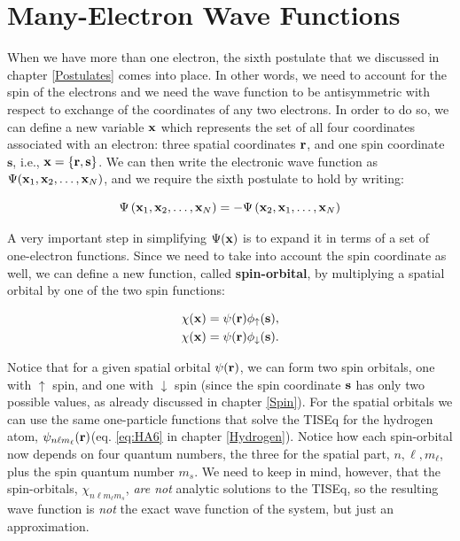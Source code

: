 \documentclass[
  9pt,
]{extbook}
\theoremstyle{definition}
\theoremstyle{definition}
\theoremstyle{definition}
\theoremstyle{remark}
\begin{document}
\hypertarget{many-electron-wave-functions}{%
\section{Many-Electron Wave Functions}\label{many-electron-wave-functions}}

When we have more than one electron, the sixth postulate that we discussed in chapter \ref{Postulates} comes into place. In other words, we need to account for the spin of the electrons and we need the wave function to be antisymmetric with respect to exchange of the coordinates of any two electrons. In order to do so, we can define a new variable \({\bf x}\) which represents the set of all four coordinates associated with an electron: three spatial coordinates \({\bf r}\), and one spin coordinate \(\mathbf{s}\), i.e., \({\bf x} = \{ {\bf r}, {\bf s} \}\). We can then write the electronic wave function as \(\Psi({\bf x}_1, {\bf x}_2, \ldots, {\bf x}_N)\), and we require the sixth postulate to hold by writing:

\begin{equation}
\Psi\left({\bf x}_1,{\bf x}_2,\ldots, {\bf x}_N\right) = - \Psi\left({\bf x}_2,{\bf x}_1,\ldots, {\bf x}_N\right)
\label{eq:atom2}  
\end{equation}

A very important step in simplifying \(\Psi({\bf x})\) is to expand it in terms of a set of one-electron functions. Since we need to take into account the spin coordinate as well, we can define a new function, called \textbf{spin-orbital}, by multiplying a spatial orbital by one of the two spin functions:

\begin{equation}
\begin{aligned}
\chi({\bf x}) &= \psi({\bf r}) \phi_{\uparrow}({\bf s}), \\
\chi({\bf x}) &= \psi({\bf r}) \phi_{\downarrow}({\bf s}).
\end{aligned}
\label{eq:atom3}
\end{equation}

Notice that for a given spatial orbital \(\psi({\bf r})\), we can form two spin orbitals, one with \(\uparrow\) spin, and one with \(\downarrow\) spin (since the spin coordinate \({\bf s}\) has only two possible values, as already discussed in chapter \ref{Spin}). For the spatial orbitals we can use the same one-particle functions that solve the TISEq for the hydrogen atom, \(\psi_{n\ell m_{\ell}}({\bf r})\)(eq. \eqref{eq:HA6} in chapter \ref{Hydrogen}). Notice how each spin-orbital now depends on four quantum numbers, the three for the spatial part, \(n,\ell,m_{\ell}\), plus the spin quantum number \(m_s\). We need to keep in mind, however, that the spin-orbitals, \(\chi_{n\ell m_{\ell} m_{s}}\), \emph{are not} analytic solutions to the TISEq, so the resulting wave function is \emph{not} the exact wave function of the system, but just an approximation.
\end{document}
